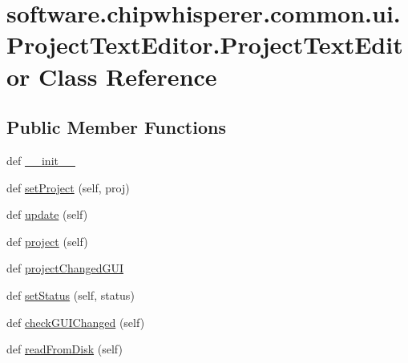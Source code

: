 \hypertarget{classsoftware_1_1chipwhisperer_1_1common_1_1ui_1_1ProjectTextEditor_1_1ProjectTextEditor}{}\section{software.\+chipwhisperer.\+common.\+ui.\+Project\+Text\+Editor.\+Project\+Text\+Editor Class Reference}
\label{classsoftware_1_1chipwhisperer_1_1common_1_1ui_1_1ProjectTextEditor_1_1ProjectTextEditor}
\subsection*{Public Member Functions}
\begin{DoxyCompactItemize}
\item 
def \hyperlink{classsoftware_1_1chipwhisperer_1_1common_1_1ui_1_1ProjectTextEditor_1_1ProjectTextEditor_a0658997b2d82f2693d14128d2453ae0f}{\+\_\+\+\_\+init\+\_\+\+\_\+}
\item 
def \hyperlink{classsoftware_1_1chipwhisperer_1_1common_1_1ui_1_1ProjectTextEditor_1_1ProjectTextEditor_af9e2a811713aad15c22df5e117f2543b}{set\+Project} (self, proj)
\item 
def \hyperlink{classsoftware_1_1chipwhisperer_1_1common_1_1ui_1_1ProjectTextEditor_1_1ProjectTextEditor_a3e58ba4c138e41e32bace0d7bbb2e713}{update} (self)
\item 
def \hyperlink{classsoftware_1_1chipwhisperer_1_1common_1_1ui_1_1ProjectTextEditor_1_1ProjectTextEditor_ae8b70706ec930b1086d189803d56f152}{project} (self)
\item 
def \hyperlink{classsoftware_1_1chipwhisperer_1_1common_1_1ui_1_1ProjectTextEditor_1_1ProjectTextEditor_a3390ba8a567a0010c5a47079ee9e4dc6}{project\+Changed\+G\+U\+I}
\item 
def \hyperlink{classsoftware_1_1chipwhisperer_1_1common_1_1ui_1_1ProjectTextEditor_1_1ProjectTextEditor_aa2823cc7558d49199b30a0bc664c0273}{set\+Status} (self, status)
\item 
def \hyperlink{classsoftware_1_1chipwhisperer_1_1common_1_1ui_1_1ProjectTextEditor_1_1ProjectTextEditor_a805cd3186f39afb718561af096c1e3b1}{check\+G\+U\+I\+Changed} (self)
\item 
def \hyperlink{classsoftware_1_1chipwhisperer_1_1common_1_1ui_1_1ProjectTextEditor_1_1ProjectTextEditor_a101cc183f58c6239a4097010a2541dbc}{read\+From\+Disk} (self)

\end{DoxyCompactItemize}

